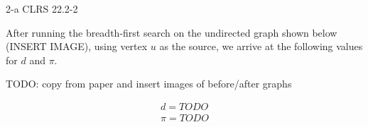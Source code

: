 \documentclass[11pt]{article}
\begin{document}
\begin{prob}{2-a}
CLRS 22.2-2
\end{prob}
\begin{sol} 

After running the breadth-first search on the undirected graph shown below (INSERT IMAGE), using vertex $u$ as the source, we arrive at the following values for $d$ and $\pi$.

TODO: copy from paper and insert images of before/after graphs

\begin{comment}

\end{comment}

\begin{eqnarray*}
d = TODO \\
\pi = TODO
\end{eqnarray*}

\end{sol}
\end{document}
